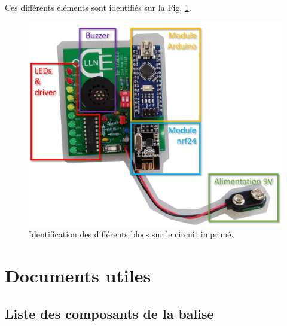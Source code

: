 \documentclass[a4paper,10pt,twoside]{article}
\begin{document}
Ces différents éléments sont identifiés sur la Fig. \ref{fig:RF_TAG_annotated}.\\

\begin{figure}[!ht]
	\centering
	\includegraphics[width=.75\textwidth]{imgs/RF_TAG_annotated.png}
	\caption{Identification des différents blocs sur le circuit imprimé.}
	\label{fig:RF_TAG_annotated}
\end{figure}

\newpage
\appendix
\section{Documents utiles}

\subsection{Liste des composants de la balise}

\newpage
\clearpage



\end{document}
